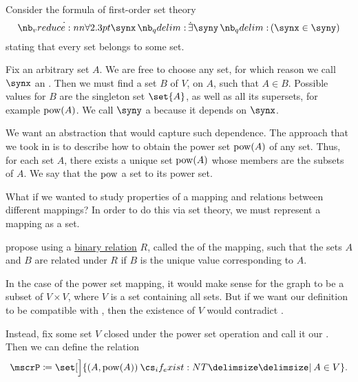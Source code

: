 \begin{remark}\label{rem:function_definition}

  Consider the formula of first-order set theory
  \begin{equation}\label{eq:rem:function_definition}
    \qforall \synx \qexists \syny (\synx \in \syny)
  \end{equation}
  stating that every set belongs to some set.

  Fix an arbitrary set \( A \). We are free to choose any set, for which reason we call \( \synx \) an . Then we must find a set \( B \) of \( V \),  on \( A \), such that \( A \in B \). Possible values for \( B \) are the singleton set \( \set{ A } \), as well as all its supersets, for example \( \operatorname{pow}(A) \). We call \( \syny \) a  because it depends on \( \synx \).

  We want an abstraction that would capture such dependence. The approach that we took in  is to describe how to obtain the power set \( \operatorname{pow}(A) \) of any set. Thus, for each set \( A \), there exists a unique set \( \operatorname{pow}(A) \) whose members are the subsets of \( A \). We say that the  \( \operatorname{pow} \)  a set to its power set.

  What if we wanted to study properties of a mapping and relations between different mappings? In order to do this via set theory, we must represent a mapping as a set.

   propose using a \hyperref[def:binary_relation]{binary relation} \( R \), called the  of the mapping, such that the sets \( A \) and \( B \) are related under \( R \) if \( B \) is the unique value corresponding to \( A \).

  In the case of the power set mapping, it would make sense for the graph to be a subset of \( V \times V \), where \( V \) is a set containing all sets. But if we want our definition to be compatible with \hyperref[def:zfc]{}, then the existence of \( V \) would contradict .

  Instead, fix some set \( V \) closed under the power set operation and call it our . Then we can define the relation
  \begin{equation*}
    \mscrP \coloneqq \set[\Big]{ (A, \pow(A)) \given* A \in V }.
  \end{equation*}


\end{remark}
